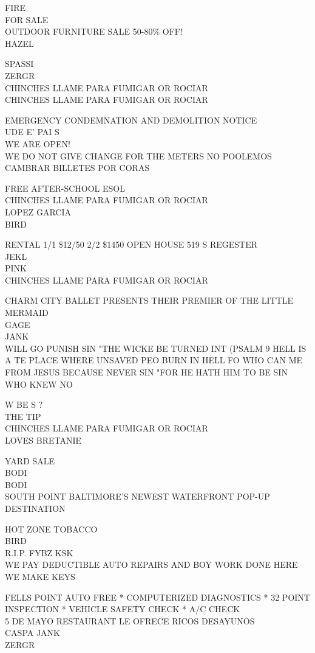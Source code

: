 \documentclass[10pt,letterpaper]{article}
\begin{document}
FIRE\\
FOR SALE\\
OUTDOOR FURNITURE SALE 50{-}80\% OFF!\\
HAZEL

SPASSI\\
ZERGR\\
CHINCHES LLAME PARA FUMIGAR OR ROCIAR\\
CHINCHES LLAME PARA FUMIGAR OR ROCIAR

EMERGENCY CONDEMNATION AND DEMOLITION NOTICE\\
UDE E' PAI S\\
WE ARE OPEN!\\
WE DO NOT GIVE CHANGE FOR THE METERS NO POOLEMOS CAMBRAR BILLETES POR CORAS

FREE AFTER{-}SCHOOL ESOL\\
CHINCHES LLAME PARA FUMIGAR OR ROCIAR\\
LOPEZ GARCIA\\
BIRD

RENTAL 1/1 \$12/50 2/2 \$1450 OPEN HOUSE 519 S REGESTER\\
JEKL\\
PINK\\
CHINCHES LLAME PARA FUMIGAR OR ROCIAR

CHARM CITY BALLET PRESENTS THEIR PREMIER OF THE LITTLE MERMAID\\
GAGE\\
JANK\\
WILL GO PUNISH SIN "THE WICKE BE TURNED INT (PSALM 9 HELL IS A TE PLACE WHERE UNSAVED PEO BURN IN HELL FO WHO CAN ME FROM JESUS BECAUSE NEVER SIN "FOR HE HATH HIM TO BE SIN WHO KNEW NO

W BE S ?\\
THE TIP\\
CHINCHES LLAME PARA FUMIGAR OR ROCIAR\\
LOVES BRETANIE

YARD SALE\\
BODI\\
BODI\\
SOUTH POINT BALTIMORE'S NEWEST WATERFRONT POP{-}UP DESTINATION

HOT ZONE TOBACCO\\
BIRD\\
R.I.P. FYBZ KSK\\
WE PAY DEDUCTIBLE AUTO REPAIRS AND BOY WORK DONE HERE WE MAKE KEYS

FELLS POINT AUTO FREE * COMPUTERIZED DIAGNOSTICS * 32 POINT INSPECTION * VEHICLE SAFETY CHECK * A/C CHECK\\
5 DE MAYO RESTAURANT LE OFRECE RICOS DESAYUNOS\\
CASPA JANK\\
ZERGR
\end{document}
